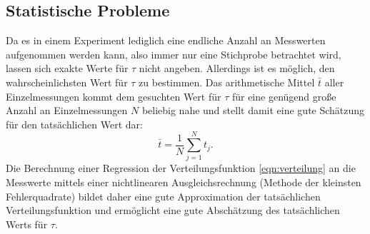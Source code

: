 \subsection{Statistische Probleme}
Da es in einem Experiment lediglich eine endliche Anzahl an Messwerten aufgenommen werden kann, also immer nur eine Stichprobe betrachtet wird, lassen sich exakte Werte für $\tau$ nicht angeben.
Allerdings ist es möglich, den wahrscheinlichsten Wert für $\tau$ zu bestimmen.
Das arithmetische Mittel $\bar{t}$ aller Einzelmessungen kommt dem gesuchten Wert für $\tau$
für eine genügend große Anzahl an Einzelmessungen $N$
beliebig nahe und stellt damit eine gute Schätzung für den tatsächlichen Wert dar:
\begin{equation}
  \bar{t}=\frac{1}{N}\sum_{j=1}^{N} t_j \mathrm{.}
\end{equation}
Die Berechnung einer Regression der Verteilungsfunktion \eqref{eqn:verteilung} an die Messwerte mittels einer nichtlinearen Ausgleichsrechnung (Methode der kleinsten Fehlerquadrate) bildet daher eine gute Approximation der tatsächlichen Verteilungsfunktion und ermöglicht eine gute Abschätzung des tatsächlichen Werts für $\tau$.
